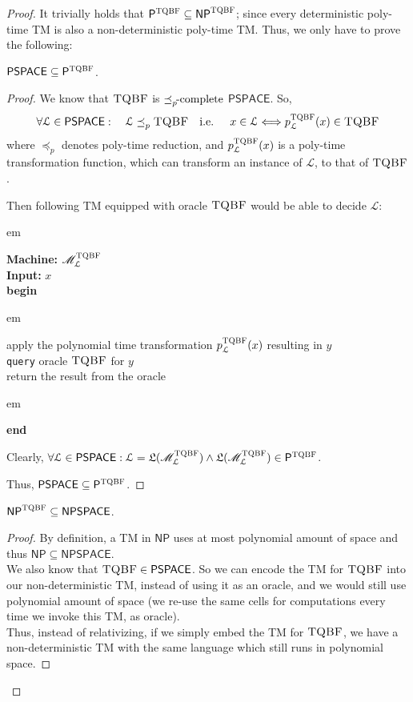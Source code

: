 \documentclass[usletter]{article}
\newcommand {\langset}[1]      {\ensuremath{\mathcal{#1}}}
\newcommand {\machine}[1]      {\ensuremath{\mathscr{#1}}}
\newcommand {\langfunc}        {\ensuremath{\mathfrak{L}}}
\newcommand {\namedlangset}[1] {\ensuremath{\textnormal{\textsc{#1}}}}
\newcommand {\family}[1]       {\ensuremath{\mathsf{#1}}}
\newcommand {\reduce}[2]    {\ensuremath{\preceq_{#1}^{#2}}}
\newcommand {\complete}[2]  {\ensuremath{\reduce{#1}{#2}     %
                                         \hspace*{-4pt}\textnormal{-complete}}}
\newcommand {\indpar}[1]   {
  \par\leftskip=#1em
  \noindent\ignorespaces
}
\newenvironment{turing}[2] {
  \smallskip
  \indpar{2}
  \textbf{Machine:} #1\\
  \textbf{Input:} $#2$\\[5pt]
  \textbf{begin}
  \parskip=0pt
  \indpar{3}
}{
  \indpar{2}
  \textbf{end}
  \par\medskip
}
\newcommand{\ie}{\textnormal{i.e. }}
\newcommand {\langL}          {\langset{L}}
\newcommand {\machineM}       {\machine{M}}
\begin{document}
\begin{enumerate}
\begin{proof}
    It trivially holds that
    $\family{P}^\namedlangset{TQBF} \subseteq \family{NP}^\namedlangset{TQBF}$;
    since every deterministic poly-time TM is also a non-deterministic poly-time
    TM. Thus, we only have to prove the following:

    \begin{claim}
      $ \family{PSPACE} \subseteq \family{P}^\namedlangset{TQBF} $.
    \end{claim}
    \begin{proof}
      We know that \namedlangset{TQBF} is \complete{p}{} \family{PSPACE}. So,
      $$
      \forall \langL \in \family{PSPACE} : \quad
      \langL \reduce{p}{} \namedlangset{TQBF} \quad \ie \quad
        x \in \langL \Longleftrightarrow p_\langL^\namedlangset{TQBF} (x)
                                         \in \namedlangset{TQBF}
      $$
      where \reduce{p}{} denotes poly-time reduction, and
      $p_\langL^\namedlangset{TQBF} (x)$ is a poly-time transformation function,
      which can transform an instance of \langL, to that of \namedlangset{TQBF}.

      Then following TM equipped with oracle \namedlangset{TQBF} would be able
      to decide \langL:
      \begin{turing}{$\machineM_\langL^\namedlangset{TQBF}$}{x}
        apply the polynomial time transformation
          $p_\langL^\namedlangset{TQBF}(x)$ resulting in $y$ \\
        \texttt{query} oracle \namedlangset{TQBF} for $y$ \\
        return the result from the oracle
      \end{turing}
      Clearly,
      $\forall \langL \in \family{PSPACE} :
        \langL = \langfunc(\machineM_\langL^\namedlangset{TQBF})
        \wedge \langfunc(\machineM_\langL^\namedlangset{TQBF})
          \in \family{P}^\namedlangset{TQBF}$.

      Thus, $\family{PSPACE} \subseteq \family{P}^\namedlangset{TQBF}$.
    \end{proof}

    \begin{claim}
      $ \family{NP}^\namedlangset{TQBF} \subseteq \family{NPSPACE} $.
    \end{claim}
    \begin{proof}
      By definition, a TM in \family{NP} uses at most polynomial amount of space
      and thus $\family{NP} \subseteq \family{NPSPACE}$. \\
      We also know that $\namedlangset{TQBF} \in \family{PSPACE}$. So we can
      encode the TM for \namedlangset{TQBF} into our non-deterministic TM,
      instead of using it as an oracle, and we would still use polynomial amount
      of space (we re-use the same cells for computations every time we invoke
      this TM, as oracle). \\
      Thus, instead of relativizing, if we simply embed the TM for
      \namedlangset{TQBF}, we have a non-deterministic TM with the same language
      which still runs in polynomial space.
    \end{proof}


\end{proof}
\end{enumerate}
\end{document}
